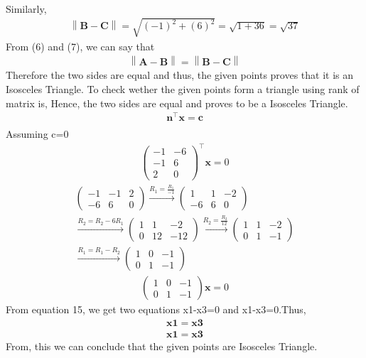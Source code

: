 \documentclass[12pt]{article}
\providecommand{\norm}[1]{\left\lVert#1\right\rVert}
\newcommand{\myvec}[1]{\ensuremath{\begin{pmatrix}#1\end{pmatrix}}}
\let\vec\mathbf
\begin{document}
\begin{enumerate}
\begin{align}
	\end{align}  
	Similarly,
	\begin{align}
		\norm{\vec{B}-\vec{C}} = \sqrt{(-1)^2+(6)^2} = \sqrt{1+36} = \sqrt{37}
\end{align}	  	
From (6) and (7), we can say that
	\begin{align}
		\norm{\vec{A}-\vec{B}} = \norm{\vec{B}-\vec{C}}
	\end{align}
Therefore the two sides are equal and thus, the given points proves that it is an Isosceles Triangle.
To check wether the given points form a triangle using rank of matrix is,
Hence, the two sides are equal and proves to be a Isosceles Triangle.
\begin{align} 
 \vec{n}^\top\vec{x}=\vec{c} \\
\end{align}
Assuming c=0
\begin{align}
\myvec{
-1 & -6
\\
-1 & 6
\\
2 & 0
}^\top\vec{x}=0 
\end{align}
\begin{align}
\myvec{
-1 & -1 & 2
\\
-6 & 6 & 0
}
\xrightarrow[]{R_1=\frac{R_1}{-1}}
\myvec{
1 & 1 & -2
\\
-6 & 6 & 0                 
}	  
\\
\xrightarrow[]{R_2=R_2-6R_1}
\myvec{
1 & 1 & -2
\\
0 & 12 & -12
}
\xrightarrow[]{R_2=\frac{R_2}{12}}
\myvec{
1 & 1 & -2
\\
0 & 1 & -1
}\\
\xrightarrow[]{R_1=R_1-R_2}
\myvec{
1 & 0 & -1
\\
0 & 1 & -1}
\end{align}
\begin{align}
\myvec{
1 & 0 & -1
\\
0 & 1 & -1}\vec{x}=0
\end{align}
From equation 15, we get two equations x1-x3=0 and x1-x3=0.Thus,
\begin{align}
\vec{x1}=\vec{x3} \\
\vec{x1}=\vec{x3}
\end{align}
From, this we can conclude that the given points are Isosceles Triangle.
\begin{figure}[!h]
	\begin{center} 

\end{center}
\end{figure}
\end{enumerate}
\end{document}
